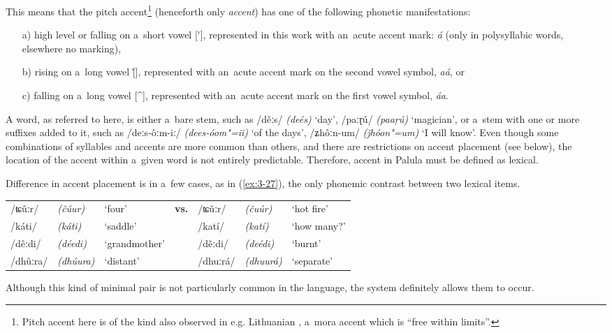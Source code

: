This means that the pitch accent\footnote{Pitch accent here is of the kind also observed in e.g. Lithuanian \citep[73--82]{szemerenyi1996}, a~mora accent which is ``free within limits''.} (henceforth only \textit{accent}) has one of the following phonetic manifestations:
\begin{enumerate}
\item[a)] high level or falling on a~short vowel [\'{}], represented in this work with an~acute accent mark: \textit{á} (only in polysyllabic words, elsewhere no marking), 
\item[b)] rising on a~long vowel [\v{}], represented with an~acute accent mark on the second vowel symbol, \textit{aá}, or 
\item[c)] falling on a~long vowel [\^{}], represented with an~acute accent mark on the first vowel symbol, \textit{áa}.
\end{enumerate}
A word, as referred to here, is either a~bare stem, such as /děːs/ \textit{(deés)} `day', /paːɽú/ \textit{(paaṛú)} `magician', or a~stem with one or more suffixes added to it, such as /deːs-ôːm-iː/ \textit{(dees-óom"=ii)} `of the days', /ʑhôːn-um/ \textit{(ǰhóon"=um)} `I will know'. Even though some combinations of syllables and accents are more common than others, and there are restrictions on accent placement (see below), the location of the accent within a~given word is not entirely predictable. Therefore, accent in Palula must be defined as lexical. 


Difference in accent placement is in a~few cases, as in (\ref{ex:3-27}), the only phonemic contrast between two lexical items.


\begin{exe}
\extab
\label{ex:3-27}
\begin{tabularx}{116mm}{ l l Q l l l Q }
/ʨûːr/ &
\textit{(čúur)} &
`four' &
\textbf{vs.} &
/ʨǔːr/ &
\textit{(čuúr)} &
`hot fire'\\
/káti/ &
\textit{(káti)} &
`saddle' &
&
/katí/ &
\textit{(katí)} &
`how many?'\\
/dêːdi/ &
\textit{(déedi)} &
`grand\-mother' &
&
/děːdi/ &
\textit{(deédi)} &
`burnt'\\
/dhûːra/ &
\textit{(dhúura)} &
`distant' &
&
/dhuːrá/ &
\textit{(dhuurá)} &
`separate'\\
\end{tabularx}
\end{exe}

Although this kind of minimal pair is not particularly common in the language, the system definitely allows them to occur.

